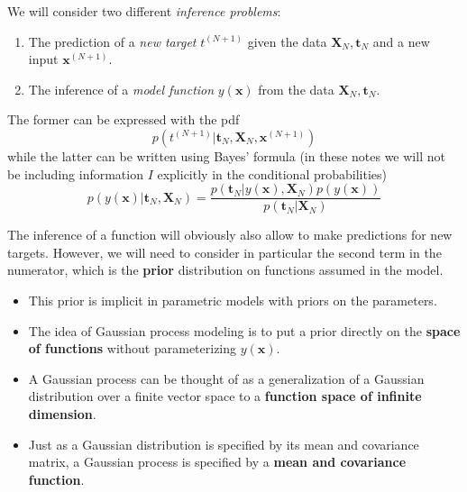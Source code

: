 \documentclass[%
oneside,                 %
final,                   %
10pt]{article}
\begin{document}
\noindent
We will consider two different \emph{inference problems}:

\begin{enumerate}
\item The prediction of a \emph{new target} $t^{(N+1)}$ given the data $\boldsymbol{X}_N, \boldsymbol{t}_N$ and a new input $\boldsymbol{x}^{(N+1)}$.

\item The inference of a \emph{model function} $y(\boldsymbol{x})$ from the data $\boldsymbol{X}_N, \boldsymbol{t}_N$.
\end{enumerate}

\noindent
The former can be expressed with the pdf
\[ 
p\left( t^{(N+1)} | \boldsymbol{t}_N, \boldsymbol{X}_{N}, \boldsymbol{x}^{(N+1)} \right)
\]
while the latter can be written using Bayes' formula (in these notes we will not be including information $I$ explicitly in the conditional probabilities)
\[ p\left( y(\boldsymbol{x}) | \boldsymbol{t}_N, \boldsymbol{X}_N \right)
= \frac{p\left( \boldsymbol{t}_N | y(\boldsymbol{x}), \boldsymbol{X}_N \right) p \left( y(\boldsymbol{x}) \right) }
{p\left( \boldsymbol{t}_N | \boldsymbol{X}_N \right) } \]

The inference of a function will obviously also allow to make predictions for new targets. 
However, we will need to consider in particular the second term in the numerator, which is the \textbf{prior} distribution on functions assumed in the model.

\begin{itemize}
\item This prior is implicit in parametric models with priors on the parameters.

\item The idea of Gaussian process modeling is to put a prior directly on the \textbf{space of functions} without parameterizing $y(\boldsymbol{x})$.

\item A Gaussian process can be thought of as a generalization of a Gaussian distribution over a finite vector space to a \textbf{function space of infinite dimension}.

\item Just as a Gaussian distribution is specified by its mean and covariance matrix, a Gaussian process is specified by a \textbf{mean and covariance function}.
\end{itemize}

\noindent
\end{document}
